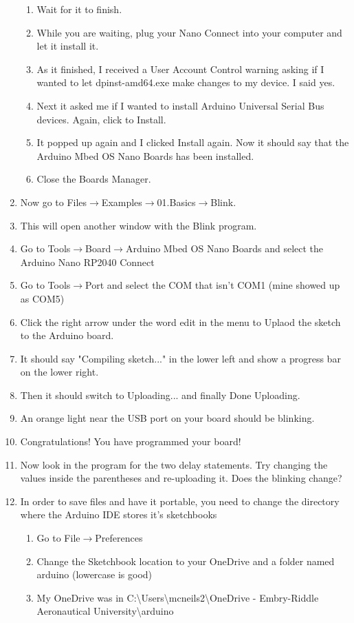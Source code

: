 \begin{enumerate}
\begin{enumerate}
		\item Wait for it to finish.
		\item While you are waiting, plug your Nano Connect into your computer and let it install it.
		\item As it finished, I received a User Account Control warning asking if I wanted to let dpinst-amd64.exe make changes to my device. I said yes.
		\item Next it asked me if I wanted to install Arduino Universal Serial Bus devices. Again, click to Install.
		\item It popped up again and I clicked Install again. Now it should say that the Arduino Mbed OS Nano Boards has been installed.
		\item Close the Boards Manager.
	\end{enumerate}
	\item Now go to Files$\rightarrow$Examples$\rightarrow$01.Basics$\rightarrow$Blink.
	\item This will open another window with the Blink program.
	\item Go to Tools$\rightarrow$Board$\rightarrow$Arduino Mbed OS Nano Boards and select the Arduino Nano RP2040 Connect
	\item Go to Tools$\rightarrow$Port and select the COM that isn't COM1 (mine showed up as COM5)
	\item Click the right arrow under the word edit in the menu to Uplaod the sketch to the Arduino board.
	\item It should say "Compiling sketch..." in the lower left and show a progress bar on the lower right.
	\item Then it should switch to Uploading... and finally Done Uploading.
	\item An orange light near the USB port on your board should be blinking.
	\item Congratulations! You have programmed your board!
	\item Now look in the program for the two delay statements. Try changing the values inside the parentheses and re-uploading it. Does the blinking change?
	\item In order to save files and have it portable, you need to change the directory where the Arduino IDE stores it's sketchbooks
	\begin{enumerate}
		\item Go to File$\rightarrow$Preferences
		\item Change the Sketchbook location to your OneDrive and a folder named arduino (lowercase is good)
		\item My OneDrive was in C:\textbackslash Users\textbackslash mcneils2\textbackslash OneDrive - Embry-Riddle Aeronautical University\textbackslash arduino
	\end{enumerate}
\end{enumerate}

